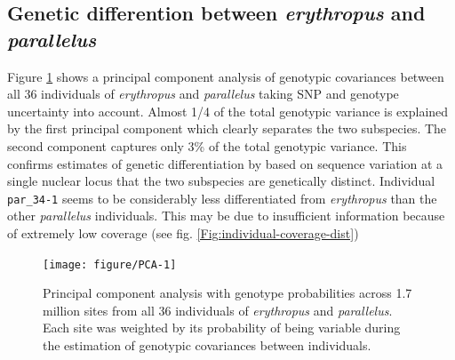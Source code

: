 \documentclass[a4paper,12pt,times,print,index,custombib,custommargin]{PhDThesisPSnPDF}\usepackage[]{graphicx}\usepackage[]{color}
\newenvironment{knitrout}{}{} %
\begin{document}
%
%
\subsection{Genetic differention between \textit{erythropus} and \textit{parallelus}}
%
%
Figure \ref{Fig:PCA} shows a principal component analysis of genotypic covariances between all 36 individuals of \textit{erythropus} and \textit{parallelus} taking SNP and genotype uncertainty into account. Almost 1/4 of the total genotypic variance is explained by the first principal component which clearly separates the two subspecies. The second component captures only 3\% of the total genotypic variance. This confirms estimates of genetic differentiation by \cite{Cooper1995} based on sequence variation at a single nuclear locus that the two subspecies are genetically distinct. Individual \texttt{par\_34-1} seems to be considerably less differentiated from \textit{erythropus} than the other \textit{parallelus} individuals. This may be due to insufficient information because of extremely low coverage (see fig. \ref{Fig:individual-coverage-dist})
%
\begin{figure}[htb!]
\centering
\begin{knitrout}
\color{fgcolor}

{\centering \texttt{[image: figure/PCA-1]} 

}



\end{knitrout}
\caption{Principal component analysis with genotype probabilities across 1.7 million sites from all 36 individuals of \textit{erythropus} and \textit{parallelus}. Each site was weighted by its probability of being variable during the estimation of genotypic covariances between individuals.}
\label{Fig:PCA}
\end{figure}
%
\end{document}
